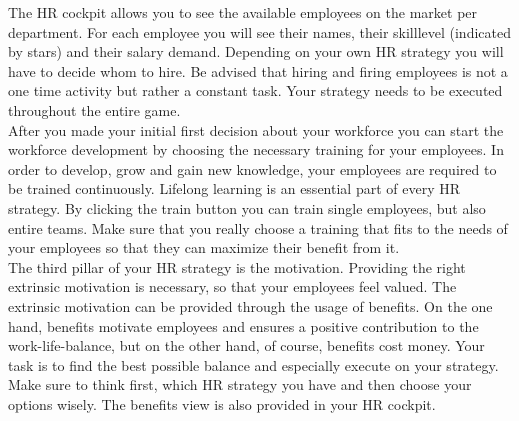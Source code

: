 The HR cockpit allows you to see the available employees on the market per department. For each employee you will see their names, their skilllevel (indicated by stars) and their salary demand. Depending on your own HR strategy you will have to decide whom to hire. Be advised that hiring and firing employees is not a one time activity but rather a constant task. Your strategy needs to be executed throughout the entire game. \\
After you made your initial first decision about your workforce you can start the workforce development by choosing the necessary training for your employees. In order to develop, grow and gain new knowledge, your employees are required to be trained continuously. Lifelong learning is an essential part of every HR strategy. By clicking the train button you can train single employees, but also entire teams. Make sure that you really choose a training that fits to the needs of your employees so that they can maximize their benefit from it. \\
The third pillar of your HR strategy is the motivation. Providing the right extrinsic motivation is necessary, so that your employees feel valued. The extrinsic motivation can be provided through the usage of benefits. On the one hand, benefits motivate employees and ensures a positive contribution to the work-life-balance, but on the other hand, of course, benefits cost money. Your task is to find the best possible balance and especially execute on your strategy. Make sure to think first, which HR strategy you have and then choose your options wisely. The benefits view is also provided in your HR cockpit.